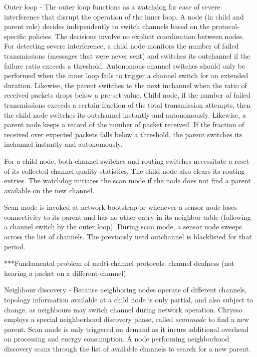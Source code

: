 Outer loop - The outer loop functions as a watchdog for case of severe interference that disrupt the operation of the inner loop. A node (in child and parent role) decides independently to switch channels based on the protocol-specific policies. The decisions involve no explicit coordination between nodes. For detecting severe interference, a child node monitors the number of failed transmissions (messages that were never sent) and switches its outchannel if the failure ratio exceeds a threshold. Autonomous channel switches should only be performed when the inner loop fails to trigger a channel switch for an extended duration. Likewise, the parent switches to the next inchannel when the ratio of received packets drops below a pre-set value.
Child node, if the number of failed transmissions exceeds a certain fraction of the total transmission attempts, then the child node switches its outchannel instantly and autonomously. Likewise, a parent node keeps a record of the number of packet received. If the fraction of received over expected packets falls below a threshold, the parent switches its inchannel instantly and autonomously. 

For a child node, both channel switches and routing switches necessitate a reset of its collected channel quality statistics. The child node also clears its routing entries. The watchdog initiates the scan mode if the node does not find a parent available on the new channel.

Scan mode is invoked at network bootstrap or whenever a sensor node loses connectivity to its parent and has no other entry in its neighbor table (following a channel switch by the outer loop). During scan mode, a sensor node sweeps across the list of channels. The previously used outchannel is blacklisted for that period.

***Fundamental problem of multi-channel protocols: channel deafness (not hearing a packet on a different channel). \cite{chrysso}

Neighbour discovery - Because neighboring nodes operate of different channels, topology information available at a child node is only partial, and also subject to change, as neighbours may switch channel during network operation. Chrysso employs a special neighborhood discovery phase, called $scan mode$ to find a new parent. Scan mode is only triggered on demand as it incurs additional overhead on processing and energy consumption. A node performing neighborhood discovery scans through the list of available channels to search for a new parent. 

